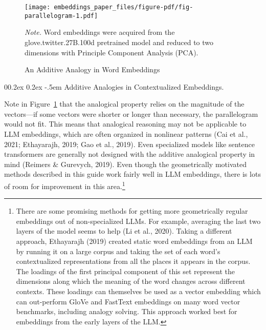 \documentclass[
  man,
  floatsintext,
  longtable,
  nolmodern,
  notxfonts,
  notimes,
  colorlinks=true,linkcolor=blue,citecolor=blue,urlcolor=blue]{apa7}
\makeatletter
\renewcommand{\paragraph}{\@startsection{paragraph}{4}{\parindent}%
	{0\baselineskip \@plus 0.2ex \@minus 0.2ex}%
	{-.5em}%
	{\normalfont\normalsize\bfseries\typesectitle}}
\makeatother
\begin{document}
\begin{figure}[!htbp]

{\caption{{An Additive Analogy in Word
Embeddings}{\label{fig-parallelogram}}}}

\texttt{[image: embeddings\_paper\_files/figure-pdf/fig-parallelogram-1.pdf]}

{\noindent \emph{Note.} Word embeddings were acquired from the
glove.twitter.27B.100d pretrained model and reduced to two dimensions
with Principle Component Analysis (PCA).}

\end{figure}

\paragraph{Additive Analogies in Contextualized
Embeddings.}\label{additive-analogies-in-contextualized-embeddings}

Note in Figure~\ref{fig-parallelogram} that the analogical property
relies on the magnitude of the vectors---if some vectors were shorter or
longer than necessary, the parallelogram would not fit. This means that
analogical reasoning may not be applicable to LLM embeddings, which are
often organized in nonlinear patterns (Cai et al., 2021; Ethayarajh,
2019; Gao et al., 2019). Even specialized models like sentence
transformers are generally not designed with the additive analogical
property in mind (Reimers \& Gurevych, 2019). Even though the
geometrically motivated methods described in this guide work fairly well
in LLM embeddings, there is lots of room for improvement in this
area.\footnote{There are some promising methods for getting more
  geometrically regular embeddings out of non-specialized LLMs. For
  example, averaging the last two layers of the model seems to help (Li
  et al., 2020). Taking a different approach, Ethayarajh (2019) created
  static word embeddings from an LLM by running it on a large corpus and
  taking the set of each word's contextualized representations from all
  the places it appears in the corpus. The loadings of the first
  principal component of this set represent the dimensions along which
  the meaning of the word changes across different contexts. These
  loadings can themselves be used as a vector embedding which can
  out-perform GloVe and FastText embeddings on many word vector
  benchmarks, including analogy solving. This approach worked best for
  embeddings from the early layers of the LLM.}
\end{document}
